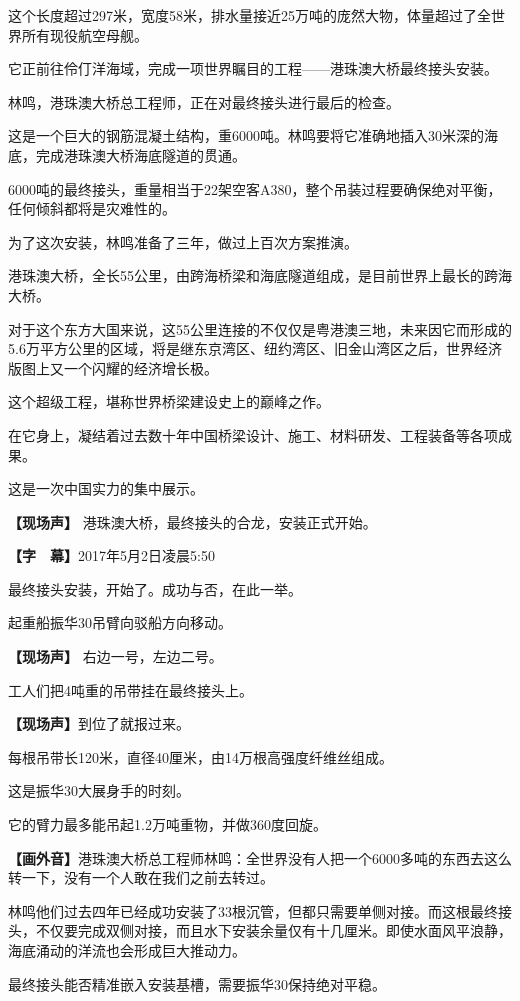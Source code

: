 \documentclass{ctexart}
\newcommand{\zkh}[1]{\textbf{\hspace{-2.7em} 【#1】}}
\begin{document}
这个长度超过297米，宽度58米，排水量接近25万吨的庞然大物，体量超过了全世界所有现役航空母舰。

 它正前往伶仃洋海域，完成一项世界瞩目的工程------港珠澳大桥最终接头安装。

林鸣，港珠澳大桥总工程师，正在对最终接头进行最后的检查。

这是一个巨大的钢筋混凝土结构，重6000吨。林鸣要将它准确地插入30米深的海底，完成港珠澳大桥海底隧道的贯通。

6000吨的最终接头，重量相当于22架空客A380，整个吊装过程要确保绝对平衡，任何倾斜都将是灾难性的。

 为了这次安装，林鸣准备了三年，做过上百次方案推演。

港珠澳大桥，全长55公里，由跨海桥梁和海底隧道组成，是目前世界上最长的跨海大桥。

对于这个东方大国来说，这55公里连接的不仅仅是粤港澳三地，未来因它而形成的5.6万平方公里的区域，将是继东京湾区、纽约湾区、旧金山湾区之后，世界经济版图上又一个闪耀的经济增长极。

 这个超级工程，堪称世界桥梁建设史上的巅峰之作。

在它身上，凝结着过去数十年中国桥梁设计、施工、材料研发、工程装备等各项成果。

 这是一次中国实力的集中展示。

 \zkh{现场声} 港珠澳大桥，最终接头的合龙，安装正式开始。

 \zkh{字　幕}2017年5月2日凌晨5:50

 最终接头安装，开始了。成功与否，在此一举。

 起重船振华30吊臂向驳船方向移动。

 \zkh{现场声} 右边一号，左边二号。

 工人们把4吨重的吊带挂在最终接头上。

 \zkh{现场声}到位了就报过来。

 每根吊带长120米，直径40厘米，由14万根高强度纤维丝组成。

 这是振华30大展身手的时刻。

 它的臂力最多能吊起1.2万吨重物，并做360度回旋。

\zkh{画外音}港珠澳大桥总工程师林鸣：全世界没有人把一个6000多吨的东西去这么转一下，没有一个人敢在我们之前去转过。

 
林鸣他们过去四年已经成功安装了33根沉管，但都只需要单侧对接。而这根最终接头，不仅要完成双侧对接，而且水下安装余量仅有十几厘米。即使水面风平浪静，海底涌动的洋流也会形成巨大推动力。

 最终接头能否精准嵌入安装基槽，需要振华30保持绝对平稳。
\end{document}
